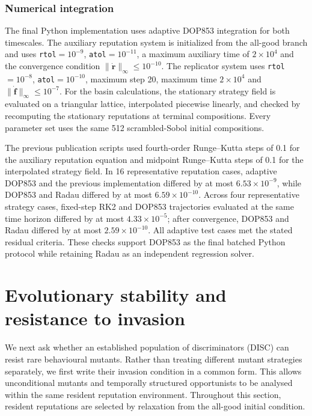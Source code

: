 \documentclass[fleqn,10pt]{wlscirep}
\begin{document}
\subsubsection{Numerical integration}

The final Python implementation uses adaptive DOP853 integration for both timescales. The auxiliary reputation system is initialized from the all-good branch and uses \texttt{rtol}$=10^{-9}$, \texttt{atol}$=10^{-11}$, a maximum auxiliary time of $2\times10^4$ and the convergence condition $\|\dot{\boldsymbol r}\|_\infty\leq10^{-10}$. The replicator system uses \texttt{rtol}$=10^{-8}$, \texttt{atol}$=10^{-10}$, maximum step 20, maximum time $2\times10^4$ and $\|\dot{\boldsymbol f}\|_\infty\leq10^{-7}$. For the basin calculations, the stationary strategy field is evaluated on a triangular lattice, interpolated piecewise linearly, and checked by recomputing the stationary reputations at terminal compositions. Every parameter set uses the same 512 scrambled-Sobol initial compositions.

The previous publication scripts used fourth-order Runge--Kutta steps of 0.1 for the auxiliary reputation equation and midpoint Runge--Kutta steps of 0.1 for the interpolated strategy field. In 16 representative reputation cases, adaptive DOP853 and the previous implementation differed by at most $6.53\times10^{-9}$, while DOP853 and Radau differed by at most $6.59\times10^{-10}$. Across four representative strategy cases, fixed-step RK2 and DOP853 trajectories evaluated at the same time horizon differed by at most $4.33\times10^{-5}$; after convergence, DOP853 and Radau differed by at most $2.59\times10^{-10}$. All adaptive test cases met the stated residual criteria. These checks support DOP853 as the final batched Python protocol while retaining Radau as an independent regression solver.



\section{Evolutionary stability and resistance to invasion}
\label{sec:si-evolutionary-stability}

We next ask whether an established population of discriminators (DISC) can resist rare behavioural mutants.
Rather than treating different mutant strategies separately, we first write their invasion condition in a common form.
This allows unconditional mutants and temporally structured opportunists to be analysed within the same resident reputation environment.
Throughout this section, resident reputations are selected by relaxation from the all-good initial condition.
\end{document}

